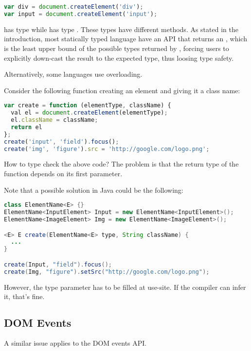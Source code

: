 \documentclass[runningheads,a4paper]{llncs}
\begin{document}
\begin{lstlisting}[language=JavaScript]
var div = document.createElement('div');
var input = document.createElement('input');
\end{lstlisting}

 has type  while  has type . These types have different
methods. As stated in the introduction, most statically typed language have an API that returns an ,
which is the least upper bound of the possible types returned by , forcing users to explicitly
down-cast the result to the expected type, thus loosing type safety.

Alternatively, some languages use overloading.

Consider the following function creating an element and giving it a class name:

\begin{lstlisting}[language=JavaScript]
var create = function (elementType, className) {
  val el = document.createElement(elementType);
  el.className = className;
  return el
};
create('input', 'field').focus();
create('img', 'figure').src = 'http://google.com/logo.png';
\end{lstlisting}

How to type check the above code? The problem is that the return type of the  function depends on its
first parameter.

Note that a possible solution in Java could be the following:

\begin{lstlisting}[language=Java]
class ElementName<E> {}
ElementName<InputElement> Input = new ElementName<InputElement>();
ElementName<ImageElement> Img = new ElementName<ImageElement>();

<E> E create(ElementName<E> type, String className) {
  ...
}

create(Input, "field").focus();
create(Img, "figure").setSrc("http://google.com/logo.png");
\end{lstlisting}

However, the type parameter  has to be filled at use-site. If the compiler can infer it, that’s fine.

\subsection{DOM Events}

A similar issue applies to the DOM events API.
\end{document}
